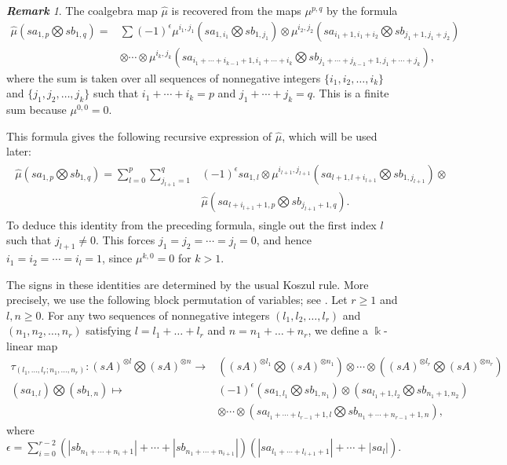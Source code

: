 \documentclass[a4paper, 11pt]{amsart}
\theoremstyle{definition}
\theoremstyle{remark}
\newtheorem{rem}[thm]{\bf Remark}
\numberwithin{equation}{section}
\begin{document}
\begin{rem}\label{rem:widehatmu}
The coalgebra map $\widehat\mu$ is recovered from the maps $\mu^{p,q}$ by the formula
\begin{align*}
\widehat \mu(sa_{1, p} \bigotimes sb_{1,q}) = {} & \sum (-1)^{\epsilon} \mu^{i_1, j_1}(sa_{1, i_1} \bigotimes sb_{1, j_1}) \otimes \mu^{i_2, j_2}(sa_{i_1+1,i_1+i_2} \bigotimes sb_{j_1+1,j_1+j_2}) \\
 & \otimes \dotsb \otimes \mu^{i_k, j_k} (sa_{i_1+\dotsb+i_{k-1}+1, i_1+\cdots+i_k}\bigotimes sb_{j_1+\dotsb+j_{k-1}+1, j_1+\cdots+j_k}),
\end{align*}
where the sum is taken over all sequences of nonnegative integers $\{i_1,i_2,\dotsc,i_k\}$ and $\{j_1,j_2,\dotsc,j_k\}$ such that $i_1+\dotsb+i_k=p$ and $j_1+\dotsb+j_k=q$. This is a finite sum because $\mu^{0,0}=0$.

This formula gives the following recursive expression of $\widehat{\mu}$, which will be used later:
\begin{align}\label{align:widehatmurecursive}
\begin{aligned}
\widehat \mu (sa_{1, p} \bigotimes sb_{1,q})
= {} \sum_{l=0}^p \sum_{j_{l+1}=1}^q & (-1)^\epsilon sa_{1,l} \otimes \mu^{i_{l+1}, j_{l+1}}(sa_{l+1, l+i_{l+1}} \bigotimes sb_{1, j_{l+1}}) \otimes \\
& \widehat \mu(sa_{l+i_{l+1}+1, p} \bigotimes sb_{j_{l+1}+1, q}).
\end{aligned}
\end{align}
To deduce this identity from the preceding formula, single out the first index $l$ such that $j_{l+1}\neq 0$. This forces $j_1=j_2=\dotsb=j_l=0$, and hence $i_1=i_2=\dotsb=i_l=1$, since $\mu^{k,0}=0$ for $k>1$.


The signs in these identities are determined by the usual Koszul rule. More precisely, we use the following block permutation of variables; see \cite[Section 5.2]{CLW}. Let $r\geq 1$ and $l,n\geq 0$.
For any two sequences of nonnegative integers $(l_1, l_2, \dots, l_r)$ and $(n_1, n_2, \dots, n_r)$ satisfying $l=l_1+\dots+l_r$ and $n=n_1+\dots+n_r$, we define a $\Bbbk$-linear map
\begin{align*}
\tau_{(l_1,\dots, l_r;n_1, \dots, n_r)}\colon (sA)^{\otimes l}\bigotimes (sA)^{\otimes n} \rightarrow & ((sA)^{\otimes l_1}\bigotimes (sA)^{\otimes n_1})\otimes\cdots\otimes ((sA)^{\otimes l_r}\bigotimes (sA)^{\otimes n_r})\\
(sa_{1,l})\bigotimes (sb_{1,n}) \mapsto & (-1)^{\epsilon} (sa_{1,l_1}\bigotimes sb_{1,n_1}) \otimes (sa_{l_1+1, l_2} \bigotimes sb_{n_1+1, n_2})\\
& \otimes \dotsb\otimes (sa_{l_1+\cdots + l_{r-1}+1, l}\bigotimes sb_{n_1+\cdots + n_{r-1}+1, n}),
\end{align*}
where $\epsilon=\sum_{i=0}^{r-2} (|sb_{n_1+\cdots+n_i+1}|+\cdots+|sb_{n_1+\cdots+n_{i+1}}|)(|sa_{l_1+\cdots+l_{i+1}+1}|+\cdots+|sa_l|)$.


\end{rem}
\end{document}
